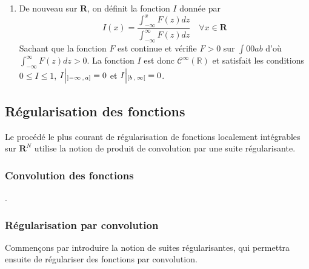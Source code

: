 \begin{enumerate}
\begin{align*}
                &= \left\{  \begin{array}{lc}
                0 & \text{si } \abs{x} \geq 1 \\
                \exp\left(\frac{1}{\abs{x}^2 - 1}\right) & \text{si } \abs{x} < 1
            \end{array} \right. \kern-\nulldelimiterspace 
            \end{align*}
            où $\abs{.}$ désigne la norme euclidienne dans $\mathbf{R}^N$. $H \in \mathcal{C}^{\infty}$ comme composée de la fonction $E$ et de la fonction $x \in \mathbf{R}^N \mapsto \abs{x}^2 - 1 \in \mathbb{R}$, toutes deux de classe $\mathcal{C}^{\infty}$. De plus, 
            \[ \text{supp}(H) = \overline{B(0,1)} = \left\{x \in \mathbf{R}^N, \abs{x} \leq 1\right\} \]   
            \item De nouveau sur $\mathbf{R}$, on définit la fonction $I$ donnée par 
            \[ I(x) = \frac{\int_{-\infty}^x F(z)dz}{\int_{-\infty}^{\infty}F(z)dz} \quad \forall x \in \mathbf{R} \]
            Sachant que la fonction $F$ est continue et vérifie $F > 0$ sur $\int00{a}{b}$ d’où $\int_{-\infty}^{\infty} F(z)dz > 0$. La fonction $I$ est donc $\mathcal{C}^{\infty}(\mathbb{R})$ et satisfait les conditions $0 \leq I \leq 1$, $I \Big|\vphantom{\big|}_{\left] -\infty \, , \, a \right]} = 0$ et $I \Big|\vphantom{\big|}_{\left[ b \, , \, \infty \right[} = 0$.
        \end{enumerate}

    \subsection{Régularisation des fonctions}

        Le procédé le plus courant de régularisation de fonctions localement intégrables sur $\mathbf{R}^N$ utilise la notion de produit de convolution par une suite régularisante.

        \subsubsection{Convolution des fonctions}

        .

        \subsubsection{Régularisation par convolution}

        Commençons par introduire la notion de suites régularisantes, qui permettra ensuite de régulariser des fonctions par convolution. 

